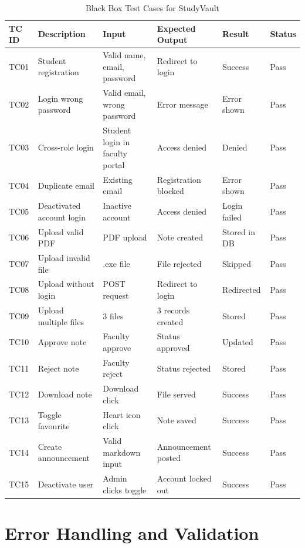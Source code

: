 \documentclass{sgcproject}
\begin{document}
\begin{table}[H]
\centering
\small
\begin{tabular}{|p{1.5cm}|p{3cm}|p{2.5cm}|p{3cm}|p{2.5cm}|p{1.2cm}|}
\hline
TC ID & Description & Input & Expected Output & Result & Status \\
\hline
TC01 & Student registration & Valid name, email, password & Redirect to login & Success & Pass \\
\hline
TC02 & Login wrong password & Valid email, wrong password & Error message & Error shown & Pass \\
\hline
TC03 & Cross-role login & Student login in faculty portal & Access denied & Denied & Pass \\
\hline
TC04 & Duplicate email & Existing email & Registration blocked & Error shown & Pass \\
\hline
TC05 & Deactivated account login & Inactive account & Access denied & Login failed & Pass \\
\hline
TC06 & Upload valid PDF & PDF upload & Note created & Stored in DB & Pass \\
\hline
TC07 & Upload invalid file & .exe file & File rejected & Skipped & Pass \\
\hline
TC08 & Upload without login & POST request & Redirect to login & Redirected & Pass \\
\hline
TC09 & Upload multiple files & 3 files & 3 records created & Stored & Pass \\
\hline
TC10 & Approve note & Faculty approve & Status approved & Updated & Pass \\
\hline
TC11 & Reject note & Faculty reject & Status rejected & Stored & Pass \\
\hline
TC12 & Download note & Download click & File served & Success & Pass \\
\hline
TC13 & Toggle favourite & Heart icon click & Note saved & Success & Pass \\
\hline
TC14 & Create announcement & Valid markdown input & Announcement posted & Success & Pass \\
\hline
TC15 & Deactivate user & Admin clicks toggle & Account locked out & Success & Pass \\
\hline
\end{tabular}
\caption{Black Box Test Cases for StudyVault}
\end{table}

\section{Error Handling and Validation}
\end{document}

